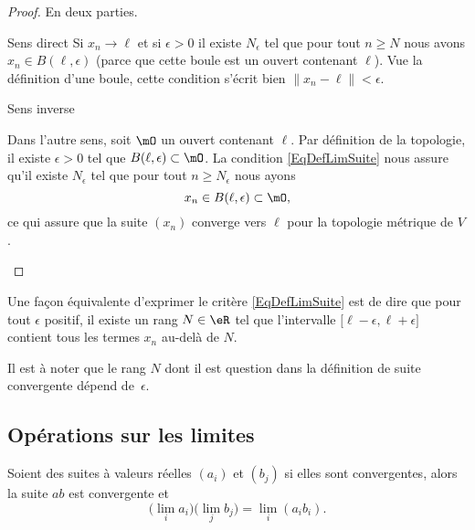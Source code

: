 \begin{proof}
    En deux parties.
    \begin{subproof}
        \item[Sens direct]
            Si \( x_n\to \ell\) et si \( \epsilon>0\) il existe \( N_{\epsilon}\) tel que pour tout \( n\geq N\) nous avons \( x_n\in B(\ell,\epsilon)\) (parce que cette boule est un ouvert contenant \( \ell\)). Vue la définition d'une boule, cette condition s'écrit bien \( \| x_n-\ell \|<\epsilon\).

        \item[Sens inverse]

            Dans l'autre sens, soit \( \mO\) un ouvert contenant \( \ell\). Par définition de la topologie, il existe \( \epsilon>0\) tel que \( B(\ell,\epsilon)\subset \mO\). La condition \eqref{EqDefLimSuite} nous assure qu'il existe \( N_{\epsilon} \) tel que pour tout \( n\geq N_{\epsilon}\) nous ayons
            \begin{equation}
             x_n\in B(\ell,\epsilon)\subset\mO,
             \end{equation}
            ce qui assure que la suite \( (x_n)\) converge vers \( \ell\) pour la topologie métrique de \( V\).
    \end{subproof}
\end{proof}

Une façon équivalente d'exprimer le critère \eqref{EqDefLimSuite} est de dire que pour tout $\epsilon$ positif, il existe un rang $N\in\eR$ tel que l'intervalle $\mathopen[ \ell-\epsilon , \ell+\epsilon \mathclose]$ contient tous les termes $x_n$ au-delà de $N$.

Il est à noter que le rang $N$ dont il est question dans la définition de suite convergente dépend de~$\epsilon$.

\subsection{Opérations sur les limites}

\begin{proposition}     \label{PROPooIQOAooJPMoDD}
    Soient des suites à valeurs réelles \( (a_i)\) et \( (b_j)\) si elles sont convergentes, alors la suite \( ab\) est convergente et
    \begin{equation}
        \big( \lim_ia_i \big)\big( \lim_jb_j \big)=\lim_i(a_ib_i).
    \end{equation}
\end{proposition}


